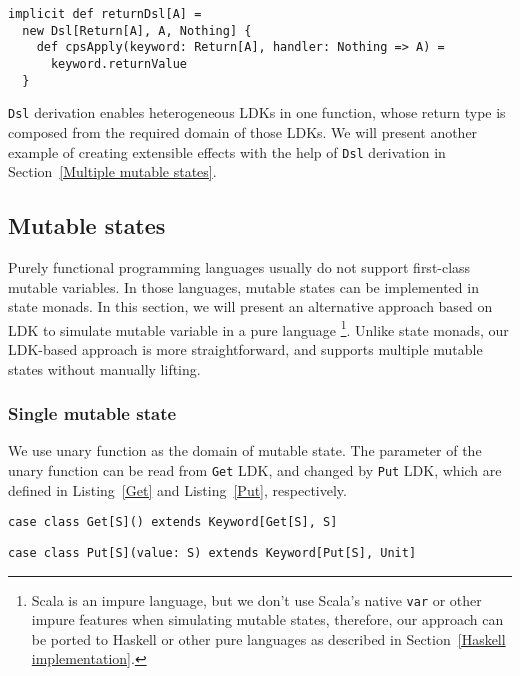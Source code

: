 \begin{lstlisting}[caption={The \lstinline{Dsl} instance of \lstinline{Return} LDK, to skip the registered callback function},label={returnDsl}]
implicit def returnDsl[A] =
  new Dsl[Return[A], A, Nothing] {
    def cpsApply(keyword: Return[A], handler: Nothing => A) =
      keyword.returnValue
  }
\end{lstlisting}

\lstinline{Dsl} derivation enables heterogeneous LDKs in one function, whose return type is composed from the required domain of those LDKs. We will present another example of creating extensible effects with the help of \lstinline{Dsl} derivation in Section~\ref{Multiple mutable states}.

\subsection{Mutable states}

Purely functional programming languages usually do not support first-class mutable variables. In those languages, mutable states can be implemented in state monads. In this section, we will present an alternative approach based on LDK to simulate mutable variable in a pure language \footnote{Scala is an impure language, but we don't use Scala's native \lstinline{var} or other impure features when simulating mutable states, therefore, our approach can be ported to Haskell or other pure languages as described in Section~\ref{Haskell implementation}.}. Unlike state monads, our LDK-based approach is more straightforward, and supports multiple mutable states without manually lifting.

\subsubsection{Single mutable state}\label{Single mutable state}

We use unary function as the domain of mutable state. The parameter of the unary function can be read from \lstinline{Get} LDK, and changed by \lstinline{Put} LDK, which are defined in Listing~\ref{Get} and Listing~\ref{Put}, respectively.

\begin{lstlisting}[caption={The definition of \lstinline{Get} LDK},label={Get}]
case class Get[S]() extends Keyword[Get[S], S]
\end{lstlisting}

\begin{lstlisting}[caption={The definition of \lstinline{Put} LDK},label={Put}]
case class Put[S](value: S) extends Keyword[Put[S], Unit]
\end{lstlisting}

